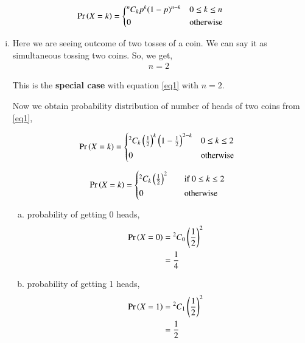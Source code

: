 \documentclass[journal,12pt,twocolumn]{IEEEtran}
\begin{document}
\begin{align}\label{eq1}
   \pr{X=k} =
  \begin{cases*}
    {^n C_k}p^{k}(1-p)^{n-k} & $0 \leq k \leq n$\\
      0 & otherwise
  \end{cases*}
\end{align}

\begin{enumerate}[(i)]
    \item Here we are seeing outcome of two tosses of a coin. We can     say it as simultaneous tossing two coins. So, we get,
        \begin{align}
            n=2
        \end{align}

    This is the \textbf{special case} with equation \eqref{eq1} with $n=2$.

Now we obtain probability distribution of number of heads of two coins from \eqref{eq1},

\begin{align*}
   \pr{X=k} =
  \begin{cases*}
    {^2 C_k}\brak{\frac{1}{2}}^{k}\brak{1-\frac{1}{2}}^{2-k} & $0 \leq k \leq 2$\\
    0 & otherwise
  \end{cases*}
\end{align*}

\begin{align}
   \pr{X=k} =
  \begin{cases*}
    {^2 C_k}\brak{\frac{1}{2}}^{2} \quad& if $0 \leq k \leq 2$ \\
    0 \quad& otherwise
  \end{cases*}
\end{align}


\begin{enumerate}[(a)]
    \item probability of getting 0 heads,
        \begin{align}
            \begin{split}
                \Pr\left(X=0\right) &= {^2C_0}\left(\frac{1}{2}\right)^2\\
                &=\frac{1}{4}
            \end{split}
        \end{align}

    \item probability of getting 1 heads,
        \begin{align}
            \begin{split}
                \Pr\left(X=1\right) &= {^2C_1}\left(\frac{1}{2}\right)^2\\
                &=\frac{1}{2}
            \end{split}
        \end{align}


\end{enumerate}
\end{enumerate}
\end{document}
